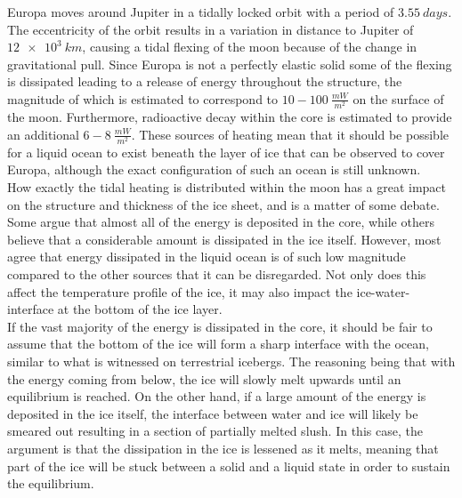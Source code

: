 Europa moves around Jupiter in a tidally locked orbit with a period of $\SI{3.55}{days}$\cite{website:europaOrbitData}. The eccentricity of the orbit results in a variation in distance to Jupiter of $\SI{12e3}{km}$, causing a tidal flexing of the moon because of the change in gravitational pull. Since Europa is not a perfectly elastic solid some of the flexing is dissipated leading to a release of energy throughout the structure, the magnitude of which is estimated to correspond to $10-\SI{100}{\frac{mW}{m^2}}$ on the surface of the moon\cite{article:barr2014a}. Furthermore, radioactive decay within the core is estimated to provide an additional $6-\SI{8}{\frac{mW}{m^2}}$\cite{article:barr2014a}. These sources of heating mean that it should be possible for a liquid ocean to exist beneath the layer of ice that can be observed to cover Europa, although the exact configuration of such an ocean is still unknown\cite{article:barr2014a}.\\

\noindent
How exactly the tidal heating is distributed within the moon has a great impact on the structure and thickness of the ice sheet, and is a matter of some debate. Some argue that almost all of the energy is deposited in the core\cite{article:lowell2005a}, while others believe that a considerable amount is dissipated in the ice itself\cite{article:mccarthy2016a}. However, most agree that energy dissipated in the liquid ocean is of such low magnitude compared to the other sources that it can be disregarded\cite{article:chen2014a}. Not only does this affect the temperature profile of the ice, it may also impact the ice-water-interface at the bottom of the ice layer.\\

\noindent
If the vast majority of the energy is dissipated in the core, it should be fair to assume that the bottom of the ice will form a sharp interface with the ocean, similar to what is witnessed on terrestrial icebergs. The reasoning being that with the energy coming from below, the ice will slowly melt upwards until an equilibrium is reached. On the other hand, if a large amount of the energy is deposited in the ice itself, the interface between water and ice will likely be smeared out resulting in a section of partially melted slush. In this case, the argument is that the dissipation in the ice is lessened as it melts, meaning that part of the ice will be stuck between a solid and a liquid state in order to sustain the equilibrium.\\

